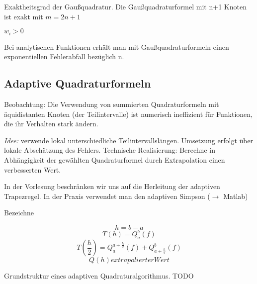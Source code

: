 \begin{theorem}[Satz I.7] Exaktheitsgrad der Gaußquadratur. Die Gaußquadraturformel mit n+1 Knoten ist exakt mit $m = 2n+1$
\end{theorem}

\begin{remark}$w_i > 0$\end{remark}
\begin{remark}Bei analytischen Funktionen erhält man mit Gaußquadraturformeln einen exponentiellen Fehlerabfall bezüglich n.\end{remark}

\subsection{Adaptive Quadraturformeln}

Beobachtung: Die Verwendung von summierten Quadraturformeln mit äquidistanten Knoten (der Teilintervalle) ist numerisch ineffizient für Funktionen, die ihr Verhalten stark ändern.

\emph{Idee:} verwende lokal unterschiedliche Teilintervallslängen. Umsetzung erfolgt über lokale Abschätzung des Fehlers. Technische Realisierung: Berechne in Abhängigkeit der gewählten Quadraturformel durch Extrapolation einen verbesserten Wert.

\begin{remark}
	In der Vorlesung beschränken wir uns auf die Herleitung der adaptiven Trapezregel. In der Praxis verwendet man den adaptiven Simpson ($\rightarrow$ Matlab)
\end{remark}

Bezeichne 

$$h = b - a$$
$$T(h) = Q_a^b(f)$$
$$T(\frac{h}{2}) = Q_a^{a+\frac{h}{2}}(f) + Q_{a+\frac{h}{2}}^b(f)$$
$$Q(h) extrapolierter Wert$$

Grundstruktur eines adaptiven Quadraturalgorithmus. TODO